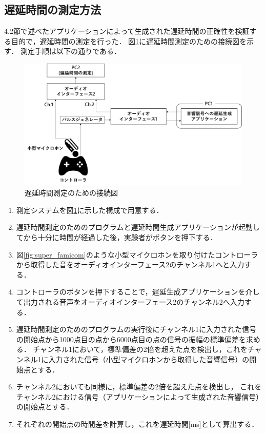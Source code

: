 \subsection{遅延時間の測定方法}
4.2節で述べたアプリケーションによって生成された遅延時間の正確性を検証する目的で，遅延時間の測定を行った．
図\ref{fig:delay_check}に遅延時間測定のための接続図を示す．
測定手順は以下の通りである．
\begin{figure}[tbp]
  \centering
  \includegraphics[scale=0.12]{figures/DelayCheck/DelayCheck_EX.pdf}
  \caption{遅延時間測定のための接続図}
  \label{fig:delay_check}
\end{figure}
\begin{enumerate}[leftmargin=*]
  \item 測定システムを図\ref{fig:delay_check}に示した構成で用意する．
  \item 遅延時間測定のためのプログラムと遅延時間生成アプリケーションが起動してから十分に時間が経過した後，実験者がボタンを押下する．
  \item 図\ref{fig:super_famicom}のような小型マイクロホンを取り付けたコントローラから取得した音をオーディオインターフェース2のチャンネル1へと入力する．
  \item コントローラのボタンを押下することで，遅延生成アプリケーションを介して出力される音声をオーディオインターフェース2のチャンネル2へ入力する．
  \item 遅延時間測定のためのプログラムの実行後にチャンネル1に入力された信号の開始点から1000点目の点から6000点目の点の信号の振幅の標準偏差を求める．
  チャンネル1において，標準偏差の2倍を超えた点を検出し，これをチャンネル1に入力された信号（小型マイクロホンから取得した音響信号）の開始点とする．
  \item チャンネル2においても同様に，標準偏差の2倍を超えた点を検出し，
  これをチャンネル2における信号（アプリケーションによって生成された音響信号）の開始点とする．
  \item それぞれの開始点の時間差を計算し，これを遅延時間[ms]として算出する．
\end{enumerate}
